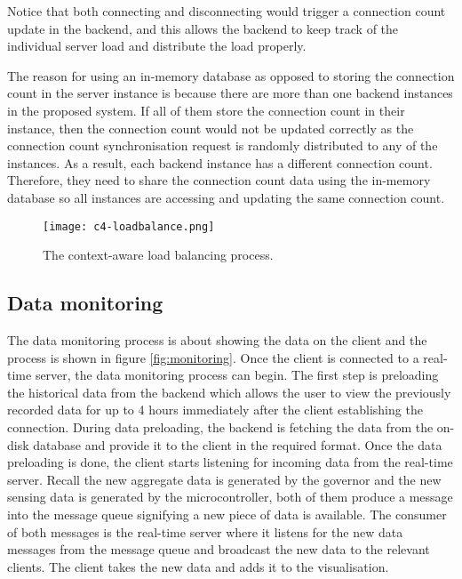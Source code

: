 \documentclass[../thesis.tex]{subfiles}
\begin{document}
Notice that both connecting and disconnecting would trigger a connection count update in the backend, and this allows the backend to keep track of the individual server load and distribute the load properly.

The reason for using an in-memory database as opposed to storing the connection count in the server instance is because there are more than one backend instances in the proposed system. If all of them store the connection count in their instance, then the connection count would not be updated correctly as the connection count synchronisation request is randomly distributed to any of the instances. As a result, each backend instance has a different connection count. Therefore, they need to share the connection count data using the in-memory database so all instances are accessing and updating the same connection count.

\begin{figure}[!ht]
\centering
\texttt{[image: c4-loadbalance.png]}
\caption{The context-aware load balancing process.}
\label{fig:loadbalancing}
\end{figure}

\subsection{Data monitoring}

The data monitoring process is about showing the data on the client and the process is shown in figure \ref{fig:monitoring}. Once the client is connected to a real-time server, the data monitoring process can begin. The first step is preloading the historical data from the backend which allows the user to view the previously recorded data for up to 4 hours immediately after the client establishing the connection. During data preloading, the backend is fetching the data from the on-disk database and provide it to the client in the required format. Once the data preloading is done, the client starts listening for incoming data from the real-time server. Recall the new aggregate data is generated by the governor and the new sensing data is generated by the microcontroller, both of them produce a message into the message queue signifying a new piece of data is available. The consumer of both messages is the real-time server where it listens for the new data messages from the message queue and broadcast the new data to the relevant clients. The client takes the new data and adds it to the visualisation.
\end{document}
